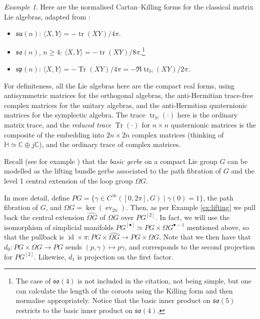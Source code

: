\documentclass[12pt]{amsart}
\DeclareMathOperator{\tr}{tr}
\DeclareMathOperator{\id}{id}
\DeclareMathOperator{\ev}{ev}
\DeclareMathOperator{\Tracered}{Tr}
\theoremstyle{plain}
\theoremstyle{definition}
\theoremstyle{remark}
\newtheorem{example}[theorem]{Example}
\numberwithin{equation}{section}
\newcommand{\<}{\langle}
\renewcommand{\>}{\rangle}
\newcommand{\Omegahat}[1]{\widehat{\Omega #1}}
\begin{document}
\begin{example}\label{eg:normalised_Killing_forms}
 Here are the normalised Cartan--Killing forms for the classical matrix Lie algebras, adapted from \cite[p~583]{Wang-Ziller_85}:
\begin{itemize}
\item $\mathfrak{su}(n)$: $\langle X,Y\rangle = -\tr(XY)/4\pi$.
\item $\mathfrak{so}(n)$, $n\geq 4$: $\langle X,Y\rangle = -\tr(XY)/8\pi$.\footnote{The case of $\mathfrak{so(4)}$ is not included in the citation, not being simple, but one can calculate the length of the coroots using the Killing form and then normalise appropriately. 
Notice that the basic inner product on $\mathfrak{so}(5)$ restricts to the basic inner product on $\mathfrak{so}(4)$.}
\item $\mathfrak{sp}(n)$: $\langle X,Y\rangle = -\Tracered(XY)/4\pi = -\Re \tr_{\mathbb{H}}(XY)/2\pi$. 
\end{itemize}
For definiteness, all the Lie algebras here are the compact real forms, using antisymmetric matrices for the orthogonal algebras, the anti-Hermitian trace-free complex matrices for the unitary algebras, and the anti-Hermitian quaternionic matrices for the symplectic algebra. 
The trace $\tr_{\mathbb{H}}(\cdot)$ here is the ordinary matrix trace, and the \emph{reduced trace} $\Tracered(\cdot)$ for $n\times n$ quaternionic matrices is the composite of the embedding into $2n\times 2n$ complex matrices (thinking of $\mathbb{H}\simeq \mathbb{C}\oplus j\mathbb{C}$), and the ordinary trace of complex matrices.
\end{example}

Recall (see for example \cite{MS03}) that the \emph{basic gerbe} on a compact Lie group $G$ can be modelled as the lifting bundle gerbe associated to the path fibration of $G$ and the level 1 central extension of the loop group $\Omega G$. 

In more detail, define $PG = \{\gamma\in C^\infty([0,2\pi],G)\mid \gamma(0)=1\}$, the path fibration of $G$, and $\Omega G = \ker (\ev_{2\pi})$. Then, as per Example \ref{ex:lifting} we pull back the central extension $\widehat{\Omega G}$ of $\Omega G $ over $PG^{[2]}$. In fact, we will use the isomorphism of simplicial manifolds $PG^{[\bullet]} \simeq PG \times \Omega G^{\bullet - 1}$ mentioned above, so that the pullback is $\id\times \pi\colon PG\times \Omegahat{G} \to PG \times \Omega G$.
Note that we then have that $d_0\colon PG\times \Omega G \to PG$ sends $(p,\gamma)\mapsto p\gamma$, and corresponds to the second projection for $PG^{[2]}$. Likewise, $d_1$ is projection on the first factor.
\end{document}
